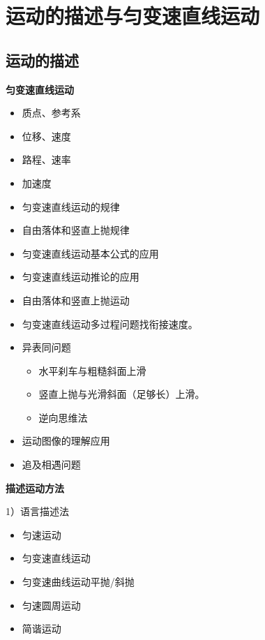 \chapter{运动的描述与匀变速直线运动}
\label{ch:01}

\section{运动的描述}
\textbf{匀变速直线运动}
\begin{itemize}
  \item 质点、参考系
  \item 位移、速度
  \item 路程、速率
  \item 加速度
\end{itemize}
\begin{itemize}
  \item 匀变速直线运动的规律
  \item 自由落体和竖直上抛规律
\end{itemize}
\begin{itemize}
  \item 匀变速直线运动基本公式的应用
  \item 匀变速直线运动推论的应用
  \item 自由落体和竖直上抛运动
  \item 匀变速直线运动多过程问题\quad 找衔接速度。
  \item 异表同问题
  \begin{itemize}
    \item 水平刹车与粗糙斜面上滑
    \item 竖直上抛与光滑斜面（足够长）上滑。
    \item 逆向思维法
  \end{itemize}
  \item 运动图像的理解应用
  \item 追及相遇问题
\end{itemize}

\textbf{描述运动方法}

1）语言描述法
\begin{itemize}
\item 匀速运动
\item 匀变速直线运动
\item 匀变速曲线运动\quad 平抛/斜抛
\item 匀速圆周运动
\item 简谐运动
\end{itemize}

